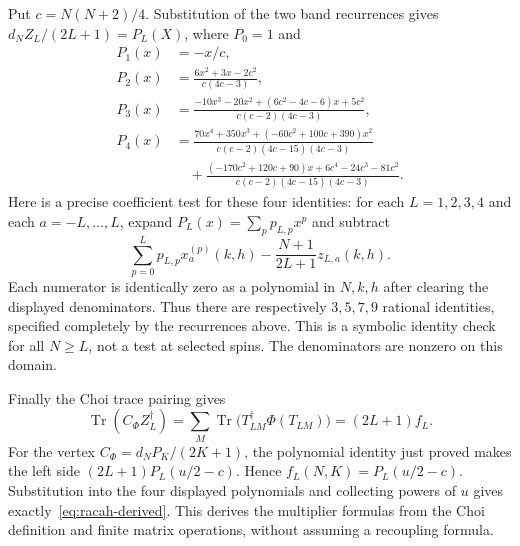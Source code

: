 \documentclass[11pt,a4paper]{article}
\begin{document}
Put $c=N(N+2)/4$. Substitution of the two band recurrences gives
$d_NZ_L/(2L+1)=P_L(X)$, where $P_0=1$ and
\begin{align*}
 P_1(x)&=-x/c,\\
 P_2(x)&=\frac{6x^2+3x-2c^2}{c(4c-3)},\\
 P_3(x)&=\frac{-10x^3-20x^2+(6c^2-4c-6)x+5c^2}
 {c(c-2)(4c-3)},\\
 P_4(x)&=\frac{70x^4+350x^3+(-60c^2+100c+390)x^2}
 {c(c-2)(4c-15)(4c-3)}\\
 &\quad+\frac{(-170c^2+120c+90)x+6c^4-24c^3-81c^2}
 {c(c-2)(4c-15)(4c-3)}.
\end{align*}
Here is a precise coefficient test for these four identities: for each
$L=1,2,3,4$ and each $a=-L,\ldots,L$, expand $P_L(x)=\sum_pp_{L,p}x^p$
and subtract
\[
 \sum_{p=0}^Lp_{L,p}x_a^{(p)}(k,h)
 -\frac{N+1}{2L+1}z_{L,a}(k,h).
\]
Each numerator is identically zero as a polynomial in $N,k,h$ after
clearing the displayed denominators. Thus there are respectively
$3,5,7,9$ rational identities, specified completely by the recurrences
above. This is a symbolic identity check for all $N\ge L$, not a test
at selected spins. The denominators are nonzero on this domain.

Finally the Choi trace pairing gives
\[
 \operatorname{Tr}(C_\Phi Z_L^\dagger)
 =\sum_M\operatorname{Tr}\bigl(T_{LM}^\dagger\Phi(T_{LM})\bigr)
 =(2L+1)f_L.
\]
For the vertex $C_\Phi=d_NP_K/(2K+1)$, the polynomial identity just
proved makes the left side $(2L+1)P_L(u/2-c)$. Hence
$f_L(N,K)=P_L(u/2-c)$. Substitution into the four displayed polynomials
and collecting powers of $u$ gives exactly~\eqref{eq:racah-derived}.
This derives the multiplier formulas from the Choi definition and
finite matrix operations, without assuming a recoupling formula.
\end{document}
